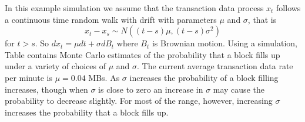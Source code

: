 \documentclass{article}
\begin{document}
In this example simulation we assume that the transaction data process $x_t$ follows a continuous time random walk with drift with parameters $\mu$ and $\sigma$, that is
\[
x_t - x_s \sim N((t-s)\mu, (t-s)\sigma^2)
\]
for $t > s$. So $dx_t = \mu dt + \sigma d B_t$ where $B_t$ is Brownian motion. Using a simulation, Table %
 contains Monte Carlo estimates of the probability that a block fills up under a variety of choices of $\mu$ and $\sigma$. The current average transaction data rate per minute  is $\mu=0.04$ MBs. As $\sigma$ increases the probability of a block filling increases, though when $\sigma$ is close to zero an increase in $\sigma$ may cause the probability to decrease slightly. For most of the range, however, increasing $\sigma$ increases the probability that a block fills up. 

\end{document}
